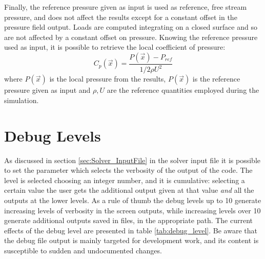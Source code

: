 Finally, the reference pressure given as input is used as reference, free stream pressure, and does not affect the results except for a constant offset in the pressure field output. Loads are computed integrating on a closed surface and so are not affected by a constant offset on pressure. Knowing the reference pressure used as input, it is possible to retrieve the local coefficient of pressure:
\begin{equation*}
    C_p(\vec{x}) = \frac{P(\vec{x})-P_{ref}}{1/2 \rho U^2}
\end{equation*}
where $P(\vec{x})$ is the local pressure from the results, $P(\vec{x})$ is the reference pressure given as input and $\rho, U$ are the reference quantities employed during the simulation. 


\section{Debug Levels}
\label{sec:Solver_DebugLevels}

As discussed in section \ref{sec:Solver_InputFile} in the solver input file it is possible to set the parameter  which selects the verbosity of the output of the code. The level is selected choosing an integer number, and it is cumulative: selecting a certain value the user gets the additional output given at that value \emph{and} all the outputs at the lower levels. 
As a rule of thumb the debug levels up to 10 generate increasing levels of verbosity in the screen outputs, while increasing levels over 10 generate additional outputs saved in files, in the appropriate  path. The current effects of the debug level are presented in table \ref{tab:debug_level}. Be aware that the debug file output is mainly targeted for development work, and its content is susceptible to sudden and undocumented changes. 

